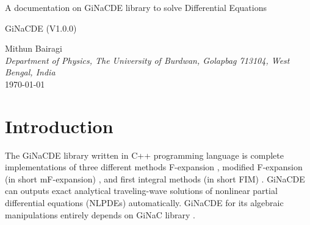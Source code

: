 \documentclass[prd,aps,floats,showkeys,nofootinbib,notitlepage]{revtex4}
\begin{document}
	
	\begin{titlepage}
		\begin{center}
			\Huge {A documentation on GiNaCDE library to solve Differential Equations} 
		\end{center}
		\vspace{3cm}
		\begin{center}
			\Large{GiNaCDE (V1.0.0)}
		\end{center}
		\vspace{2cm} 
		\begin{center} 
			Mithun Bairagi \\[3pt]  
			\textit{Department of Physics, The University of Burdwan, Golapbag 713104, West Bengal, India} \\ [1cm]
			\today
		\end{center}
	\end{titlepage}
	
	\clearpage
	
	\tableofcontents
	
	\section{Introduction}
	The GiNaCDE library written in C++ programming language is complete implementations of three different methods F-expansion \cite{fexpn024,fexpn024_1,fexpn123,0246,234}, modified F-expansion (in short mF-expansion) \cite{modfexpn}, and first integral methods (in short FIM) \cite{fim0,fim,mirza,complexTwt1}. GiNaCDE can outputs exact analytical traveling-wave solutions of nonlinear partial differential equations (NLPDEs) automatically.
	GiNaCDE for its algebraic manipulations entirely depends on GiNaC library \cite{ginac}.  
	
	
\end{document}
